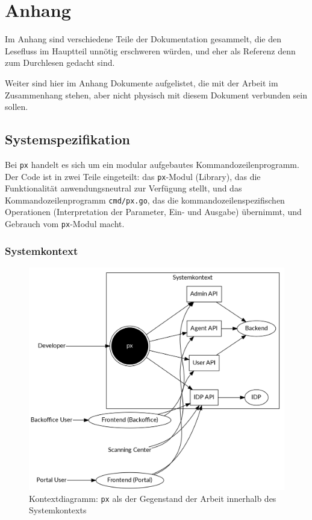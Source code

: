 \section{Anhang}

Im Anhang sind verschiedene Teile der Dokumentation gesammelt, die den Lesefluss im Hauptteil unnötig erschweren würden, und eher als Referenz denn zum Durchlesen gedacht sind.

Weiter sind hier im Anhang Dokumente aufgelistet, die mit der Arbeit im Zusammenhang stehen, aber nicht physisch mit diesem Dokument verbunden sein sollen.

\subsection{Systemspezifikation}

Bei \texttt{px} handelt es sich um ein modular aufgebautes Kommandozeilenprogramm. Der Code ist in zwei Teile eingeteilt: das \texttt{px}-Modul (Library), das die Funktionalität anwendungsneutral zur Verfügung stellt, und das Kommandozeilenprogramm \texttt{cmd/px.go}, das die kommandozeilenspezifischen Operationen (Interpretation der Parameter, Ein- und Ausgabe) übernimmt, und Gebrauch vom \texttt{px}-Modul macht.

\subsubsection{Systemkontext}
\label{sec:Systemkontext}

\begin{figure}
	\centering
	\includegraphics[width=\linewidth]{pics/kontextdiagramm.png}
	\caption{Kontextdiagramm: \texttt{px} als der Gegenstand der Arbeit innerhalb des Systemkontexts}
	\label{fig:kontextdiagramm}
\end{figure}

